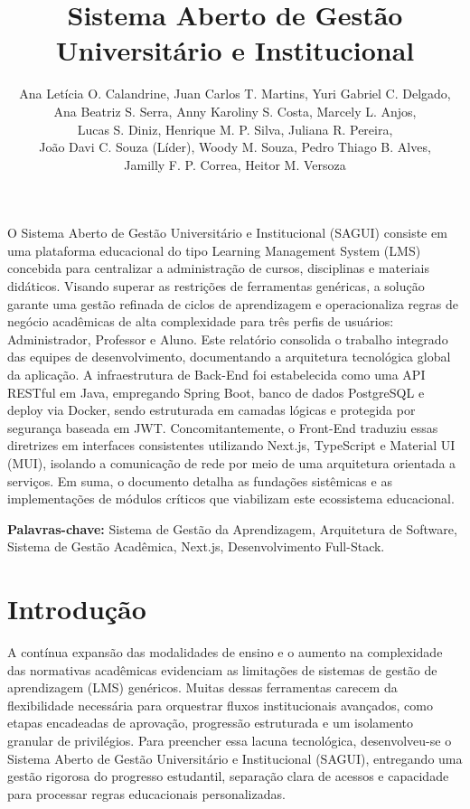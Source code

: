 \documentclass[12pt]{article}
\title{Sistema Aberto de Gestão Universitário e Institucional}
\author{Ana Letícia O. Calandrine\inst{1}, Juan Carlos T. Martins\inst{1}, Yuri Gabriel C. Delgado\inst{1},\\
Ana Beatriz S. Serra\inst{1}, Anny Karoliny S. Costa\inst{1}, Marcely L. Anjos\inst{1},\\
Lucas S. Diniz\inst{1}, Henrique M. P. Silva\inst{1}, Juliana R. Pereira\inst{1},\\
João Davi C. Souza (Líder)\inst{1}, Woody M. Souza\inst{1}, Pedro Thiago B. Alves\inst{1},\\
Jamilly F. P. Correa\inst{1}, Heitor M. Versoza\inst{1}}
\begin{document}
\maketitle

\begin{resumo}
O Sistema Aberto de Gestão Universitário e Institucional (SAGUI) consiste em uma plataforma educacional do tipo Learning Management System (LMS) concebida para centralizar a administração de cursos, disciplinas e materiais didáticos. Visando superar as restrições de ferramentas genéricas, a solução garante uma gestão refinada de ciclos de aprendizagem e operacionaliza regras de negócio acadêmicas de alta complexidade para três perfis de usuários: Administrador, Professor e Aluno. Este relatório consolida o trabalho integrado das equipes de desenvolvimento, documentando a arquitetura tecnológica global da aplicação. A infraestrutura de Back-End foi estabelecida como uma API RESTful em Java, empregando Spring Boot, banco de dados PostgreSQL e deploy via Docker, sendo estruturada em camadas lógicas e protegida por segurança baseada em JWT. Concomitantemente, o Front-End traduziu essas diretrizes em interfaces consistentes utilizando Next.js, TypeScript e Material UI (MUI), isolando a comunicação de rede por meio de uma arquitetura orientada a serviços. Em suma, o documento detalha as fundações sistêmicas e as implementações de módulos críticos que viabilizam este ecossistema educacional.

\end{resumo}

\textbf{Palavras-chave:} Sistema de Gestão da Aprendizagem, Arquitetura de Software, Sistema de Gestão Acadêmica, Next.js, Desenvolvimento Full-Stack.

\section{Introdução}

A contínua expansão das modalidades de ensino e o aumento na complexidade das normativas acadêmicas evidenciam as limitações de sistemas de gestão de aprendizagem (LMS) genéricos. Muitas dessas ferramentas carecem da flexibilidade necessária para orquestrar fluxos institucionais avançados, como etapas encadeadas de aprovação, progressão estruturada e um isolamento granular de privilégios. Para preencher essa lacuna tecnológica, desenvolveu-se o Sistema Aberto de Gestão Universitário e Institucional (SAGUI), entregando uma gestão rigorosa do progresso estudantil, separação clara de acessos e capacidade para processar regras educacionais personalizadas.
\end{document}
